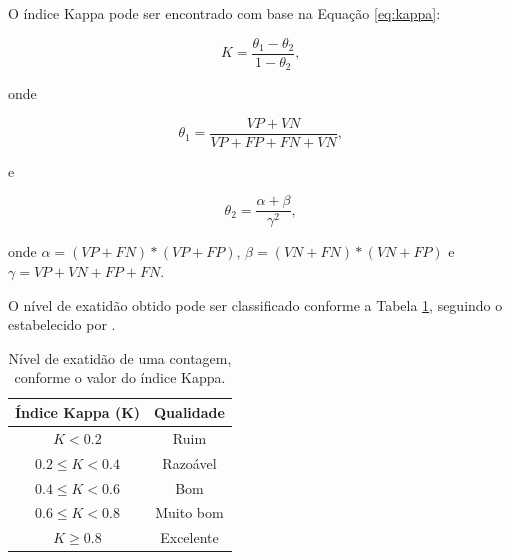 O índice Kappa pode ser encontrado com base na Equação \ref{eq:kappa}:

\begin{equation}
  \label{eq:kappa}
  K=\dfrac{\theta_{1}-\theta_{2}}{1-\theta_{2}}\text{,}
\end{equation}

\noindent onde

\begin{equation}
  \label{eq:theta_1}
  \theta_{1}=\dfrac{VP+VN}{VP+FP+FN+VN}\text{,}
\end{equation}

\noindent e

\begin{equation}
  \label{eq:theta_2}
  \theta_{2}=\dfrac{\alpha+\beta}{\gamma^{2}}\text{,}
\end{equation}

\noindent onde $\alpha=(VP+FN)*(VP+FP)$, $\beta=(VN+FN)*(VN+FP)$ e $\gamma=VP+VN+FP+FN$.

O nível de exatidão obtido pode ser classificado conforme a Tabela \ref{tab:indice_kappa}, seguindo o estabelecido por \citeauthor{landis1977measurement} \citep{landis1977measurement}.

\begin{table}[ht]
  \caption{Nível de exatidão de uma contagem, conforme o valor do índice Kappa.}
  \label{tab:indice_kappa}
  \begin{center}
    \begin{tabular}{cc}
    \toprule
    \textbf{Índice Kappa (K)} & \textbf{Qualidade} \\
    \midrule
      $K < 0.2$ & Ruim \\
      $0.2 \leq K < 0.4$ & Razoável \\
      $0.4 \leq K < 0.6$ & Bom \\
      $0.6 \leq K < 0.8$ & Muito bom \\
      $K \geq 0.8$ & Excelente \\
    \bottomrule
    \end{tabular}
  \end{center}
\end{table}


